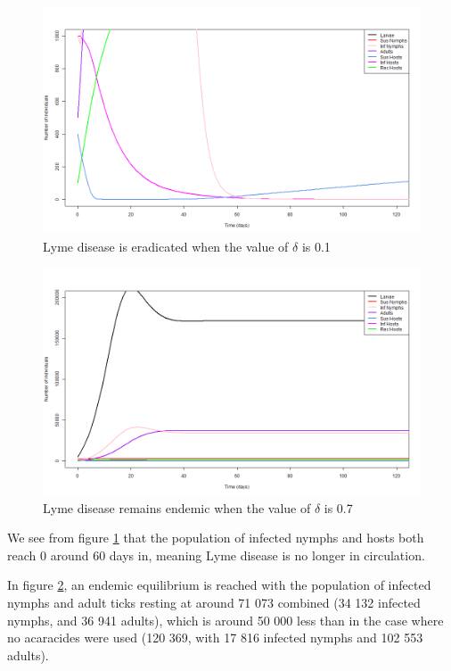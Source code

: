 \documentclass[12pt, centerh1]{article}
\begin{document}
\begin{figure}[h]
    \centering
    \includegraphics[scale = 0.4]{figures/intervention_eradicated.png}
    \caption{Lyme disease is eradicated when the value of $\delta$ is 0.1}
    \label{fig:eradicated}
\end{figure}

\begin{figure}[h]
    \centering
    \includegraphics[scale = 0.4]{figures/intervention_endemic.png}
    \caption{Lyme disease remains endemic when the value of $\delta$ is 0.7}
    \label{fig:endemic}
\end{figure}

We see from figure \ref{fig:eradicated} that the population of infected nymphs and hosts both reach 0 around 60 days in, meaning Lyme disease is no longer in circulation. 

In figure \ref{fig:endemic}, an endemic equilibrium is reached with the population of infected nymphs and adult ticks resting at around 71 073 combined (34 132 infected nymphs, and 36 941 adults), which is around 50 000 less than in the case where no acaracides were used (120 369, with 17 816 infected nymphs and 102 553 adults).
\end{document}
